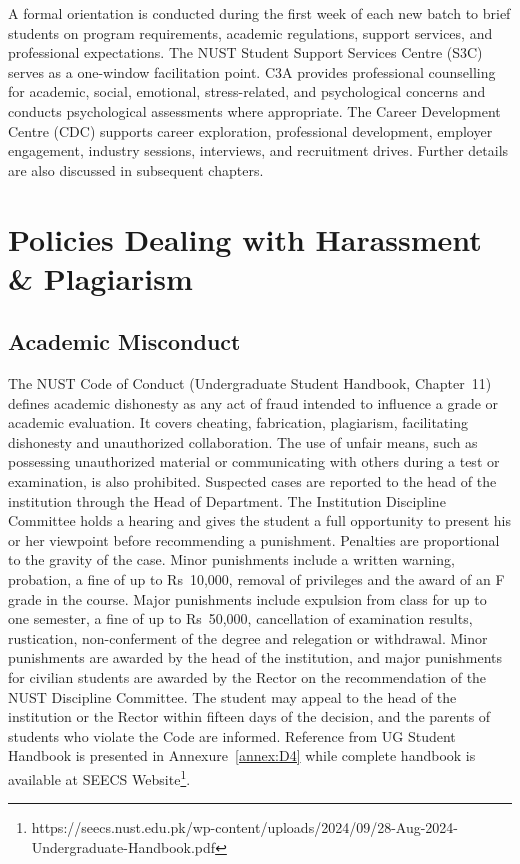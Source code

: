 A formal orientation is conducted during the first week of each new batch to brief students on program requirements, academic regulations, support services, and professional expectations. The NUST Student Support Services Centre (S3C) serves as a one-window facilitation point. C3A provides professional counselling for academic, social, emotional, stress-related, and psychological concerns and conducts psychological assessments where appropriate. The Career Development Centre (CDC) supports career exploration, professional development, employer engagement, industry sessions, interviews, and recruitment drives. Further details are also discussed in subsequent chapters.


\section{Policies Dealing with Harassment \& Plagiarism}
\label{sec:plag}
\subsection{Academic Misconduct}
The NUST Code of Conduct (Undergraduate Student Handbook, Chapter~11) defines academic dishonesty as any act of fraud intended to influence a grade or academic evaluation. It covers cheating, fabrication, plagiarism, facilitating dishonesty and unauthorized collaboration. The use of unfair means, such as possessing unauthorized material or communicating with others during a test or examination, is also prohibited. Suspected cases are reported to the head of the institution through the Head of Department. The Institution Discipline Committee holds a hearing and gives the student a full opportunity to present his or her viewpoint before recommending a punishment. Penalties are proportional to the gravity of the case. Minor punishments include a written warning, probation, a fine of up to Rs~10,000, removal of privileges and the award of an F grade in the course. Major punishments include expulsion from class for up to one semester, a fine of up to Rs~50,000, cancellation of examination results, rustication, non-conferment of the degree and relegation or withdrawal. Minor punishments are awarded by the head of the institution, and major punishments for civilian students are awarded by the Rector on the recommendation of the NUST Discipline Committee. The student may appeal to the head of the institution or the Rector within fifteen days of the decision, and the parents of students who violate the Code are informed. Reference from UG Student Handbook is presented in Annexure~\ref{annex:D4} while complete handbook is available at SEECS Website\footnote{https://seecs.nust.edu.pk/wp-content/uploads/2024/09/28-Aug-2024-Undergraduate-Handbook.pdf}.
